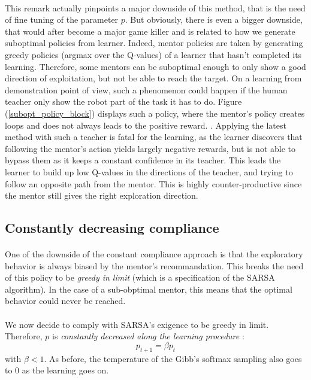 \documentclass[a4paper]{report}
\begin{document}
{{{			\paragraph{} This remark actually pinpoints a major downside of this method, that is the need of fine tuning of the parameter $p$. But obviously, there is even a bigger downside, that would after become a major game killer and is related to how we generate suboptimal policies from learner. Indeed, mentor policies are taken by generating greedy policies (argmax over the Q-values) of a learner that hasn't completed its learning. Therefore, some mentors can be suboptimal enough to only show a good direction of exploitation, but not be able to reach the target. On a learning from demonstration point of view, such a phenomenon could happen if the human teacher only show the robot part of the task it has to do. Figure (\ref{subopt_policy_block}) displays such a policy, where the mentor's policy creates loops and does not always leads to the positive reward.  \newline. 
			Applying the latest method with such a teacher is fatal for the learning, as the learner discovers that following the mentor's action yields largely negative rewards, but is not able to bypass them as it keeps a constant confidence in its teacher. This leads the learner to build up low Q-values in the directions of the teacher, and trying to follow an opposite path from the mentor. This is highly counter-productive since the mentor still gives the right exploration direction. 
		
		\subsection{Constantly decreasing compliance }
		{
			\paragraph{} One of the downside of the constant compliance approach is that the exploratory behavior is always biased by the mentor's recommandation. This breaks the need of this policy to be \emph{greedy in limit} (which is a specification of the SARSA algorithm). In the case of a sub-obptimal mentor, this means that the optimal behavior could never be reached. 
			
			\paragraph{} We now decide to comply with SARSA's exigence to be greedy in limit. Therefore, $p$ is \emph{constantly decreased along the learning procedure} : 
			\begin{equation}
				p_{t+1} = \beta p_{t}
			\end{equation}
			with $\beta < 1$. As before, the temperature of the Gibb's softmax sampling also goes to $0$ as the learning goes on. 
			
}}}}
\end{document}
